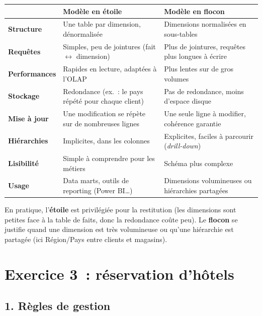 \begin{center}
\small
\begin{tabularx}{\linewidth}{>{\bfseries}l X X}
	\toprule
	& \textbf{Modèle en étoile} & \textbf{Modèle en flocon} \\
	\midrule
	Structure & Une table par dimension, dénormalisée & Dimensions normalisées en sous-tables \\
	Requêtes & \good{} Simples, peu de jointures (fait $\leftrightarrow$ dimension) & \bad{} Plus de jointures, requêtes plus longues à écrire \\
	Performances & \good{} Rapides en lecture, adaptées à l'OLAP & \bad{} Plus lentes sur de gros volumes \\
	Stockage & \bad{} Redondance (ex.~: le pays répété pour chaque client) & \good{} Pas de redondance, moins d'espace disque \\
	Mise à jour & \bad{} Une modification se répète sur de nombreuses lignes & \good{} Une seule ligne à modifier, cohérence garantie \\
	Hiérarchies & \bad{} Implicites, dans les colonnes & \good{} Explicites, faciles à parcourir (\textit{drill-down}) \\
	Lisibilité & \good{} Simple à comprendre pour les métiers & \bad{} Schéma plus complexe \\
	Usage & Data marts, outils de reporting (Power BI\dots) & Dimensions volumineuses ou hiérarchies partagées \\
	\bottomrule
\end{tabularx}
\end{center}

\noindent En pratique, l'\textbf{étoile} est privilégiée pour la restitution (les dimensions sont petites face à la table de faits, donc la redondance coûte peu). Le \textbf{flocon} se justifie quand une dimension est très volumineuse ou qu'une hiérarchie est partagée (ici Région/Pays entre clients et magasins).

\newpage
\section*{Exercice 3~: réservation d'hôtels}

\subsection*{1. Règles de gestion}
{}

